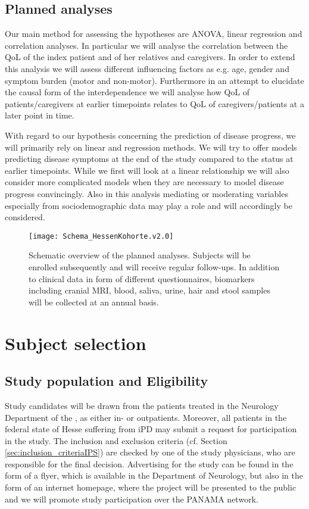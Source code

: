 \subsection{Planned analyses}
Our main method for assessing the hypotheses are \acs{ANOVA}, linear regression and correlation analyses. In particular we will analyse the correlation between the \ac{QoL} of the index patient and of her relatives and caregivers. In order to extend this analysis we will assess different influencing factors as e.g. age, gender and symptom burden (motor and non-motor). Furthermore in an attempt to elucidate the causal form of the interdependence we will analyse how \ac{QoL} of patients/caregivers at earlier timepoints relates to \ac{QoL} of caregivers/patients at a later point in time.

With regard to our hypothesis concerning the prediction of disease progress, we will primarily rely on linear and regression methods. We will try to offer models predicting disease symptoms at the end of the study compared to the status at earlier timepoints. While we first will look at a linear relationship we will also consider more complicated models when they are necessary to model disease progress convincingly. Also in this analysis mediating or moderating variables especially from sociodemographic data may play a role and will accordingly be considered.

\begin{figure}[h]
\label{fig2:scheme}
\centering
\texttt{[image: Schema\_HessenKohorte.v2.0]}
\caption{Schematic overview of the planned analyses. Subjects will be enrolled subsequently and will receive regular follow-ups. In addition to clinical data in form of different questionnaires, biomarkers including cranial \ac{MRI}, blood, saliva, urine, hair and stool samples will be collected at an annual basis.}
\end{figure}


\section{Subject selection}
\label{sec:study_selection}
\subsection{Study population and Eligibility}
\label{sec:study_population}
Study candidates will be drawn from the patients treated in the Neurology Department of the \UKM, as either in- or outpatients. Moreover, all patients in the federal state of Hesse suffering from \ac{iPD} may submit a request for participation in the study. The inclusion and exclusion criteria (cf. Section \ref{sec:inclusion_criteriaIPS}) are checked by one of the study physicians, who are responsible for the final decision. Advertising for the study can be found in the form of a flyer, which is available in the Department of Neurology, but also in the form of an internet homepage, where the project will be presented to the public and we will promote study participation over the \ac{PANAMA} network.

